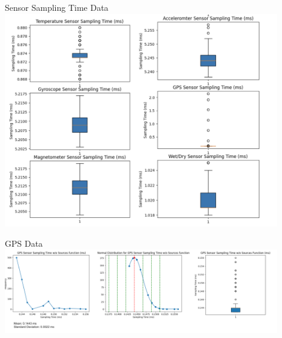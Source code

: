 \begin{frame}{Sensor Sampling Time Data}
    \centering
    \includegraphics[height=0.9\textheight,width=0.9\textwidth,keepaspectratio]{images/boxplots.png}
\end{frame}

\begin{frame}{GPS Data}
    \centering
    \includegraphics[height=0.9\textheight,width=0.9\textwidth,keepaspectratio]{images/gpsdata.png}
\end{frame}




